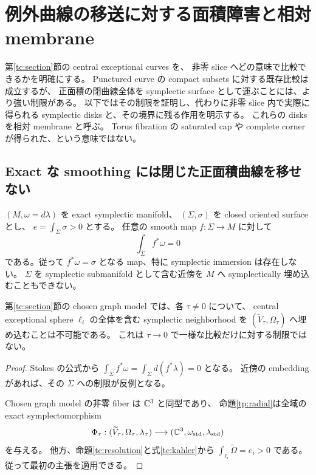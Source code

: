 \section{例外曲線の移送に対する面積障害と相対 membrane}
\label{exm:section}

第\ref{tc:section}節の central exceptional curves を、
非零 slice へどの意味で比較できるかを明確にする。
Punctured curve の compact subsets に対する既存比較は成立するが、
正面積の閉曲線全体を symplectic surface として運ぶことには、より強い制限がある。
以下ではその制限を証明し、代わりに非零 slice 内で実際に得られる
symplectic disks と、その境界に残る作用を明示する。
これらの disks を相対 membrane と呼ぶ。
Torus fibration の saturated cap や complete corner が得られた、という意味ではない。

\subsection{Exact な smoothing には閉じた正面積曲線を移せない}

\begin{proposition}
\label{exm:exact-obstruction}
$(M,\omega=d\lambda)$ を exact symplectic manifold、
$(\Sigma,\sigma)$ を closed oriented surface とし、
$e=\int_\Sigma\sigma>0$ とする。
任意の smooth map $f:\Sigma\to M$ に対して
\[
 \int_\Sigma f^*\omega=0
\]
である。従って $f^*\omega=\sigma$ となる map、特に symplectic immersion は存在しない。
$\Sigma$ を symplectic submanifold として含む近傍を $M$ へ
symplectically 埋め込むこともできない。

第\ref{tc:section}節の chosen graph model では、各 $\tau\ne0$ について、
central exceptional sphere $\ell_i$ の全体を含む symplectic neighborhood を
$(\widetilde V_\tau,\Omega_\tau)$ へ埋め込むことは不可能である。
これは $\tau\to0$ で一様な比較だけに対する制限ではない。
\end{proposition}

\begin{proof}
Stokes の公式から
$\int_\Sigma f^*\omega=\int_\Sigma d(f^*\lambda)=0$ となる。
近傍の embedding があれば、その $\Sigma$ への制限が反例となる。

Chosen graph model の非零 fiber は $\mathbb C^3$ と同型であり、
命題\ref{tp:radial}は全域の exact symplectomorphism
\[
 \Phi_\tau:
 (\widetilde V_\tau,\Omega_\tau,\lambda_\tau)
 \longrightarrow(\mathbb C^3,\omega_{\rm std},\lambda_{\rm std})
\]
を与える。
他方、命題\ref{tc:resolution}と式\eqref{tc:kahler}から
$\int_{\ell_i}\widetilde\Omega=e_i>0$ である。
従って最初の主張を適用できる。
\end{proof}

